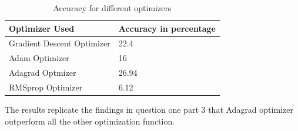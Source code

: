 \documentclass[12pt]{report}
\begin{document}
\begin{table}[H]
	\centering
	\caption{Accuracy for different optimizers}
	\begin{tabular}{|l|l|}
		\hline
		Optimizer Used             & Accuracy in percentage \\ \hline
		Gradient Descent Optimizer & 22.4                   \\ \hline
		Adam Optimizer             & 16                     \\ \hline
		Adagrad Optmizer           & 26.94                  \\ \hline
		RMSprop Optimizer          & 6.12                   \\ \hline
	\end{tabular}
	\label{tb:2}
\end{table}

The results replicate the findings in question one part 3 that Adagrad optimizer outperform all the other optimization function. 
\end{document}
